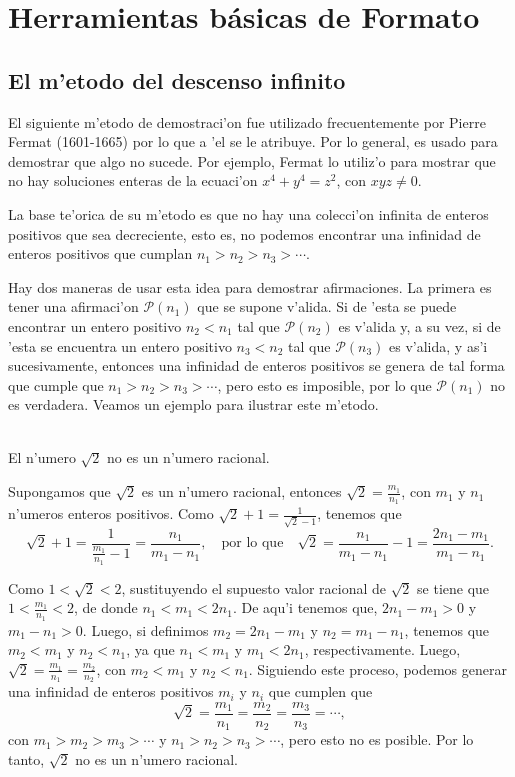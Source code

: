 \documentclass [spanish,12pt]{article}
\begin{document}
\section{Herramientas b\'asicas de Formato}

\subsection{El m'etodo del descenso infinito}

El siguiente m'etodo de demostraci'on fue utilizado frecuentemente 
por Pierre Fermat (1601-1665) por lo que a 'el se le atribuye. Por lo general, 
es usado para demostrar que algo no sucede. 
Por ejemplo, Fermat lo utiliz'o
para mostrar que no hay soluciones enteras de la ecuaci'on $x^4 + y^4=z^2$, 
con $xyz\neq 0$.


La base te'orica de su m'etodo es que no hay una colecci'on 
infinita de enteros positivos que sea decreciente, esto es, no podemos 
encontrar una infinidad de enteros positivos que cumplan 
$n_1 > n_2 > n_3>\cdots$.

\noindent Hay dos maneras de usar esta idea para demostrar afirmaciones. 
La primera es tener una afirmaci'on $\mathcal{P}(n_1)$ que se supone v'alida. 
Si de 'esta se puede encontrar un entero positivo $n_2 <n_1$ tal que  
$\mathcal{P}(n_2)$ es v'alida y, a su vez, si de 'esta se encuentra un 
entero positivo $n_3< n_2$ tal que  $\mathcal{P}(n_3)$ es v'alida, y as'i 
sucesivamente, entonces una infinidad de enteros positivos se genera de tal 
forma  que cumple que $n_1>n_2>n_3>\cdots$, pero esto es imposible, por lo 
que  $\mathcal{P}(n_1)$ no es verdadera. Veamos un ejemplo para ilustrar este 
m'etodo.

\vspace{.2in}

\\
El n'umero $\sqrt{2}$ no es un n'umero racional.

\vspace{.2in}

\noindent Supongamos que $\sqrt 2$ es un n'umero racional, entonces 
$\sqrt 2=\frac{m_1}{n_1}$, con $m_1$ y $n_1$ n'umeros enteros positivos.
Como $\sqrt{2}+1=\frac{1}{\sqrt{2}-1}$, tenemos que
$$
 \sqrt{2}+1=\frac{1}{\frac{m_1}{n_1}-1}=\frac{n_1}{m_1-n_1},\quad\text{por lo que}\quad   \sqrt{2}=\frac{n_1}{m_1-n_1}-1=\frac{2n_1-m_1}{m_1-n_1}.
$$

\noindent Como  $1< \sqrt{2}<2$, sustituyendo el supuesto valor racional de $\sqrt{2}$ se tiene que  $1< \frac{m_1}{n_1}<2$, de donde
$n_1 < m_1 < 2n_1$. De aqu'i tenemos que, $2n_1-m_1 >0$ y $m_1- n_1 >0$. Luego, si definimos $m_2=2n_1-m_1$ y $n_2=m_1-n_1$, tenemos que $m_2< m_1$ y   $n_2<n_1$, ya que $n_1<m_1$ y $m_1<2n_1$, respectivamente. Luego, $\sqrt{2}=\frac{m_1}{n_1}=\frac{m_2}{n_2}$, con $m_2<m_1$ y $n_2<n_1$. Siguiendo este proceso, podemos generar una infinidad de enteros positivos $m_i$ y $n_i$ que cumplen que
$$ \sqrt{2} =\frac{m_1}{n_1}=\frac{m_2}{n_2}=\frac{m_3}{n_3}=\cdots,$$
con $m_1 >m_2>m_3>\cdots$ y $n_1 >n_2>n_3>\cdots$,
pero esto no es posible. Por lo tanto, $\sqrt{2}$ no es un n'umero racional.

 
\end{document}
